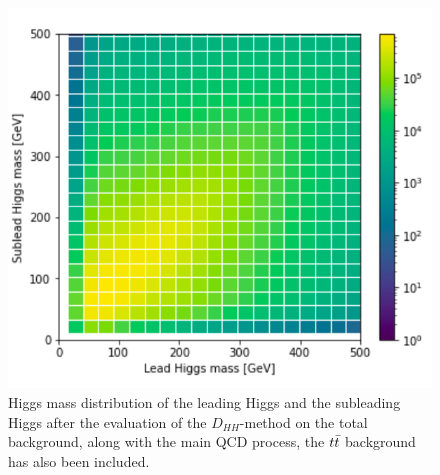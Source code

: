 \begin{figure}[hbt]
    \centering
    \includegraphics[width=0.5\linewidth]{Images/6.Improving/Run 3 result.png}
    \caption{Higgs mass distribution of the leading Higgs and the subleading Higgs after the evaluation of the $D_{HH}$-method on the total background, along with the main QCD process, the $t\Bar{t}$ background has also been included. \cite{ANRun3}}
    \label{fig: AN 2d dist}
\end{figure}

